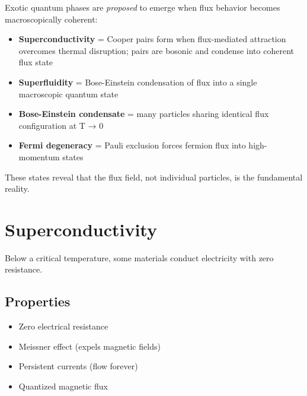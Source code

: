 \documentclass[
  11pt,
  letterpaper,
  twoside,
  openright]{book}
\providecommand{\tightlist}{%
  \setlength{\itemsep}{0pt}\setlength{\parskip}{0pt}}
\begin{document}
\begin{tcolorbox}[enhanced jigsaw, coltitle=black, colbacktitle=quarto-callout-note-color!10!white, toprule=.15mm, colframe=quarto-callout-note-color-frame, arc=.35mm, opacityback=0, bottomtitle=1mm, toptitle=1mm, breakable, colback=white, titlerule=0mm, opacitybacktitle=0.6, title=\textcolor{quarto-callout-note-color}{\faInfo}\hspace{0.5em}{How FTD Proposes Exotic States {[}CONJECTURE{]}}, rightrule=.15mm, bottomrule=.15mm, leftrule=.75mm, left=2mm]

Exotic quantum phases are \emph{proposed} to emerge when flux behavior
becomes macroscopically coherent:

\begin{itemize}
\tightlist
\item
  \textbf{Superconductivity} = Cooper pairs form when flux-mediated
  attraction overcomes thermal disruption; pairs are bosonic and
  condense into coherent flux state
\item
  \textbf{Superfluidity} = Bose-Einstein condensation of flux into a
  single macroscopic quantum state
\item
  \textbf{Bose-Einstein condensate} = many particles sharing identical
  flux configuration at T → 0
\item
  \textbf{Fermi degeneracy} = Pauli exclusion forces fermion flux into
  high-momentum states
\end{itemize}

These states reveal that the flux field, not individual particles, is
the fundamental reality.

\end{tcolorbox}

\section{Superconductivity}\label{superconductivity}

Below a critical temperature, some materials conduct electricity with
zero resistance.

\subsection{Properties}\label{properties-5}

\begin{itemize}
\tightlist
\item
  Zero electrical resistance
\item
  Meissner effect (expels magnetic fields)
\item
  Persistent currents (flow forever)
\item
  Quantized magnetic flux
\end{itemize}
\end{document}
